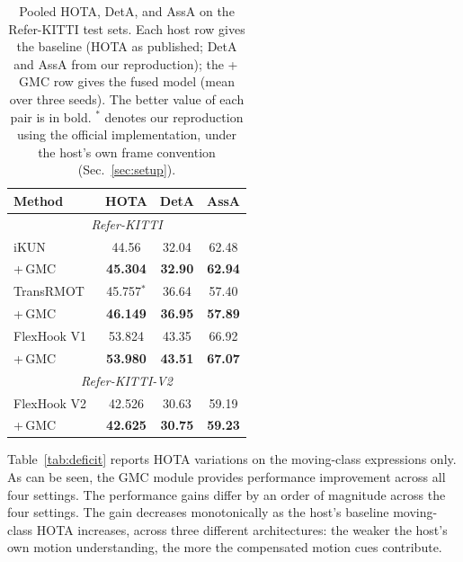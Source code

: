 \documentclass{article}
\begin{document}
\begin{table}[t]
  \centering
  \caption{Pooled HOTA, DetA, and AssA on the Refer-KITTI test sets. Each host row gives the baseline (HOTA as published; DetA and AssA from our reproduction); the +\,GMC row gives the fused model (mean over three seeds). The better value of each pair is in bold. $^*$ denotes our reproduction using the official implementation, under the host's own frame convention (Sec.~\ref{sec:setup}).}
  \label{tab:main}
  \footnotesize
  \begin{tabular*}{\linewidth}{@{\extracolsep{\fill}}lccc}
    \hline
    Method                      & HOTA               & DetA  & AssA  \\
    \hline
    \multicolumn{4}{c}{\textit{Refer-KITTI}} \\
    \hline
    iKUN~\cite{ikun}            & 44.56              & 32.04 & 62.48 \\
    \quad +\,GMC                & \textbf{45.304} & \textbf{32.90} & \textbf{62.94} \\
    \hline
    TransRMOT~\cite{transrmot}  & 45.757$^*$         & 36.64 & 57.40 \\
    \quad +\,GMC                & \textbf{46.149} & \textbf{36.95} & \textbf{57.89} \\
    \hline
    FlexHook V1~\cite{flexhook} & 53.824             & 43.35 & 66.92 \\
    \quad +\,GMC                & \textbf{53.980} & \textbf{43.51} & \textbf{67.07} \\
    \hline
    \multicolumn{4}{c}{\textit{Refer-KITTI-V2}} \\
    \hline
    FlexHook V2~\cite{flexhook} & 42.526             & 30.63 & 59.19 \\
    \quad +\,GMC                & \textbf{42.625} & \textbf{30.75} & \textbf{59.23} \\
    \hline
  \end{tabular*}
\end{table}

Table~\ref{tab:deficit} reports HOTA variations on the moving-class expressions only. As can be seen, the GMC module provides performance improvement across all four settings. The performance gains differ by an order of magnitude across the four settings. The gain decreases monotonically as the host's baseline moving-class HOTA increases, across three different architectures: the weaker the host's own motion understanding, the more the compensated motion cues contribute.
\end{document}
